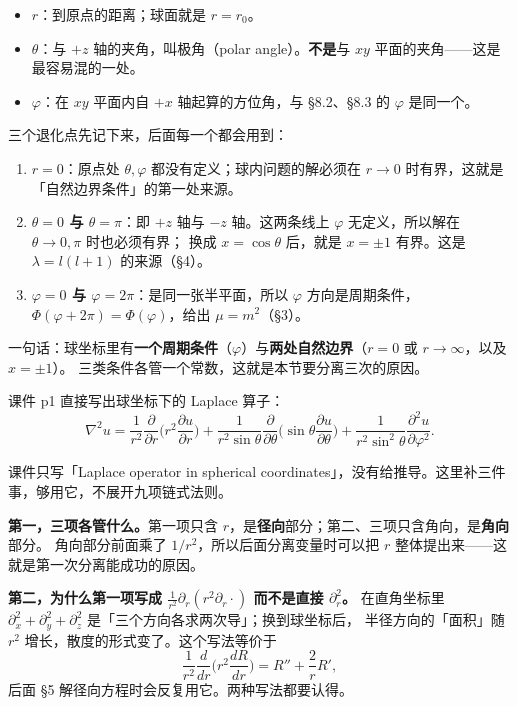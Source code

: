 \begin{itemize}
  \item $r$：到原点的距离；球面就是 $r=r_0$。
  \item $\theta$：与 $+z$ 轴的夹角，叫极角（polar angle）。\textbf{不是}与 $xy$ 平面的夹角——这是最容易混的一处。
  \item $\varphi$：在 $xy$ 平面内自 $+x$ 轴起算的方位角，与 §8.2、§8.3 的 $\varphi$ 是同一个。
\end{itemize}

三个退化点先记下来，后面每一个都会用到：

\begin{enumerate}[label=(\arabic*)]
  \item \textbf{$r=0$}：原点处 $\theta,\varphi$ 都没有定义；球内问题的解必须在 $r\to0$ 时有界，这就是「自然边界条件」的第一处来源。
  \item \textbf{$\theta=0$ 与 $\theta=\pi$}：即 $+z$ 轴与 $-z$ 轴。这两条线上 $\varphi$ 无定义，所以解在 $\theta\to0,\pi$ 时也必须有界；
        换成 $x=\cos\theta$ 后，就是 $x=\pm1$ 有界。这是 $\lambda=l(l+1)$ 的来源（\S4）。
  \item \textbf{$\varphi=0$ 与 $\varphi=2\pi$}：是同一张半平面，所以 $\varphi$ 方向是周期条件，$\Phi(\varphi+2\pi)=\Phi(\varphi)$，给出 $\mu=m^2$（\S3）。
\end{enumerate}

一句话：球坐标里有\textbf{一个周期条件}（$\varphi$）与\textbf{两处自然边界}（$r=0$ 或 $r\to\infty$，以及 $x=\pm1$）。
三类条件各管一个常数，这就是本节要分离三次的原因。


课件 p1 直接写出球坐标下的 Laplace 算子：
\begin{equation}
\nabla^2u=\frac{1}{r^2}\frac{\partial}{\partial r}\Big(r^2\frac{\partial u}{\partial r}\Big)
+\frac{1}{r^2\sin\theta}\frac{\partial}{\partial\theta}\Big(\sin\theta\frac{\partial u}{\partial\theta}\Big)
+\frac{1}{r^2\sin^2\theta}\frac{\partial^2u}{\partial\varphi^2}.
\label{eq:lap}
\end{equation}

课件只写「Laplace operator in spherical coordinates」，没有给推导。这里补三件事，够用它，不展开九项链式法则。

\textbf{第一，三项各管什么。}第一项只含 $r$，是\textbf{径向}部分；第二、三项只含角向，是\textbf{角向}部分。
角向部分前面乘了 $1/r^2$，所以后面分离变量时可以把 $r$ 整体提出来——这就是第一次分离能成功的原因。

\textbf{第二，为什么第一项写成 $\frac1{r^2}\partial_r(r^2\partial_r\cdot)$ 而不是直接 $\partial_r^2$。}
在直角坐标里 $\partial_x^2+\partial_y^2+\partial_z^2$ 是「三个方向各求两次导」；换到球坐标后，
半径方向的「面积」随 $r^2$ 增长，散度的形式变了。这个写法等价于
\[
\frac{1}{r^2}\frac{d}{dr}\Big(r^2\frac{dR}{dr}\Big)=R''+\frac2rR',
\]
后面 \S5 解径向方程时会反复用它。两种写法都要认得。

